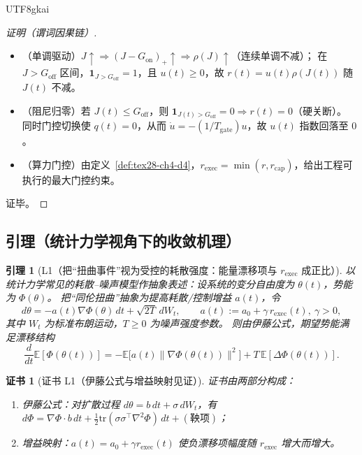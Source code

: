 \documentclass[12pt]{article}
\newtheorem{lemma}{引理}[section]
\newtheorem{Certificate}{证书}[section]
\newcommand{\indicator}[1]{\mathbf{1}_{#1}}
\begin{document}
\begin{CJK*}{UTF8}{gkai}
\begin{proof}[证明（谓词因果链）]
\begin{itemize}
  \item（单调驱动）$J\uparrow \Rightarrow (J-G_{\mathrm{on}})_{+}\uparrow \Rightarrow \rho(J)\uparrow$（连续单调不减）；
  在 $J>G_{\mathrm{off}}$ 区间，$\indicator{J>G_{\mathrm{off}}}=1$，且 $u(t)\ge 0$，故 $r(t)=u(t)\rho(J(t))$ 随 $J(t)$ 不减。
  \item（阻尼归零）若 $J(t)\le G_{\mathrm{off}}$，则 $\indicator{J(t)>G_{\mathrm{off}}}=0\Rightarrow r(t)=0$（硬关断）。
  同时门控切换使 $q(t)=0$，从而 $\dot u=-(1/T_{\mathrm{gate}})u$，故 $u(t)$ 指数回落至 $0$。
  \item（算力门控）由定义~\ref{def:tex28-ch4-d4}，$r_{\mathrm{exec}}=\min(r,r_{\mathrm{cap}})$，给出工程可执行的最大门控约束。
\end{itemize}
证毕。
\end{proof}

\subsection{引理（统计力学视角下的收敛机理）}
\label{subsec:tex28-ch4-lemmas}

\begin{lemma}[L1（把“扭曲事件”视为受控的耗散强度：能量漂移项与 $r_{\mathrm{exec}}$ 成正比）]
\label{lem:tex28-ch4-l1}
以统计力学常见的耗散--噪声模型作抽象表述：设系统的变分自由度为 $\theta(t)$，势能为 $\Phi(\theta)$。
把“同伦扭曲”抽象为提高耗散/控制增益 $a(t)$，令
\[
  d\theta = -a(t)\nabla \Phi(\theta)\,dt + \sqrt{2T}\,dW_t,
  \qquad
  a(t):=a_0+\gamma\, r_{\mathrm{exec}}(t),\ \gamma>0,
\]
其中 $W_t$ 为标准布朗运动，$T\ge 0$ 为噪声强度参数。
则由伊藤公式，期望势能满足漂移结构
\[
  \frac{d}{dt}\mathbb{E}[\Phi(\theta(t))]
  = -\mathbb{E}\bigl[a(t)\|\nabla\Phi(\theta(t))\|^2\bigr] + T\,\mathbb{E}[\Delta\Phi(\theta(t))].
\]
\end{lemma}

\begin{Certificate}[证书 L1（伊藤公式与增益映射见证）]
\label{cert:tex28-ch4-l1}
证书由两部分构成：
\begin{enumerate}
  \item 伊藤公式：对扩散过程 $d\theta=b\,dt+\sigma\,dW_t$，有 $d\Phi=\nabla\Phi\cdot b\,dt + \frac12\mathrm{tr}
    (\sigma\sigma^\top\nabla^2\Phi)\,dt + (\text{鞅项})$；
  \item 增益映射：$a(t)=a_0+\gamma r_{\mathrm{exec}}(t)$ 使负漂移项幅度随 $r_{\mathrm{exec}}$ 增大而增大。
\end{enumerate}
\end{Certificate}


\end{CJK*}
\end{document}
